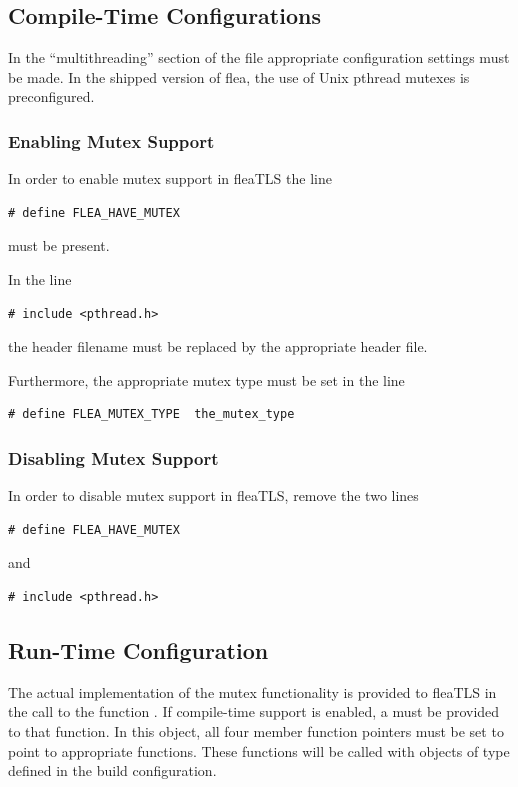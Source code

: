 \documentclass[a4paper,11pt]{scrartcl}
\begin{document}
\subsection{Compile-Time Configurations}

In the ``multithreading'' section of the file  
appropriate configuration settings must be made. In the shipped version of flea,
the use of Unix pthread mutexes is preconfigured. 

\subsubsection{Enabling Mutex Support}
In order to enable mutex support in fleaTLS the line 

\begin{verbatim}
# define FLEA_HAVE_MUTEX
\end{verbatim}
must be present.

In the line
\begin{verbatim}
# include <pthread.h>
\end{verbatim}
the header filename must be replaced by the appropriate header file.

Furthermore, the appropriate mutex type must be set in the line 
\begin{verbatim}
# define FLEA_MUTEX_TYPE  the_mutex_type
\end{verbatim}

\subsubsection{Disabling Mutex Support}
In order to disable mutex support in fleaTLS, remove the two lines
\begin{verbatim}
# define FLEA_HAVE_MUTEX
\end{verbatim}
and
\begin{verbatim}
# include <pthread.h>
\end{verbatim}

\subsection{Run-Time Configuration}

The actual implementation of the mutex functionality is provided to fleaTLS in
the call to the function \funcLibInit. If compile-time support is enabled, a
 must be provided to that function. In this object,
all four member function pointers must be set to point to appropriate functions.
These functions will be called with objects of type 
defined in the build configuration.
\end{document}
